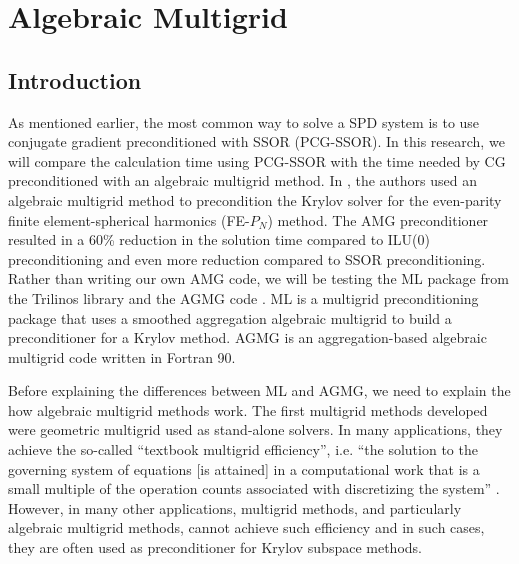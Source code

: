 \section{Algebraic Multigrid} \label{sec_amg}
\subsection{Introduction}
As mentioned earlier, the most common way to solve a SPD system is to use
conjugate gradient preconditioned with SSOR (PCG-SSOR). In this research, we
will compare the calculation time using PCG-SSOR with the time needed by CG 
preconditioned with an algebraic multigrid method. In \cite{amg_pn}, the authors 
used an algebraic multigrid method to precondition the Krylov solver for the 
even-parity finite element-spherical harmonics (FE-$P_N$) method. The AMG 
preconditioner resulted in a 60\% reduction in the solution time compared to 
ILU(0) preconditioning and even more reduction compared to SSOR preconditioning. 
Rather than writing our own AMG code, we will be testing the ML package 
\cite{ml_guide} from the Trilinos library and the AGMG code \cite{agmg_guide}. 
ML is a multigrid preconditioning package that uses a smoothed aggregation 
algebraic multigrid to build a preconditioner for a Krylov method. AGMG is an 
aggregation-based algebraic multigrid code written in Fortran 90.

Before explaining the differences between ML and AGMG, we need to explain the
how algebraic multigrid methods work. The first multigrid methods
developed were geometric multigrid used as stand-alone solvers. In many 
applications, they achieve the so-called ``textbook multigrid
efficiency'', i.e. ``the solution to the governing system of equations [is
attained] in a computational work that is a small multiple of the operation
counts associated with discretizing the system'' \cite{textbook_eff}. However, 
in many other applications, multigrid methods, and particularly algebraic 
multigrid methods, cannot achieve such efficiency \cite{k_cycle} and in
such cases, they are often used as preconditioner for Krylov subspace methods. 

